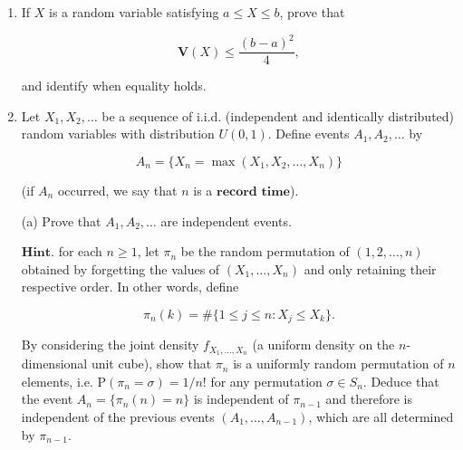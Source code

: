 \documentclass[11pt]{report}
\newcommand{\R}{\mathbb{R}}
\theoremstyle{plain}
\theoremstyle{definition}
\begin{document}
\begin{enumerate}[label=\arabic*.]
\noindent Deduce using the mean value theorem that if $\varphi$
is twice continuously differentiable and satisfies
$\varphi''\ge 0$ then it is convex.

(b) Prove $\textbf{Jensen's inequality}$, which says
that if $X$ is a random variable such that
$\mathrm{P}(X\in (a,b))=1$ and $\varphi:(a,b)\to\R$
is convex, then

\[
\varphi(\mathbf{E}X) \le \mathbf{E}(\varphi(X)).
\]

\noindent $\textbf{Hint.}$ Start by proving the following
property of a convex function: If $\varphi$ is convex
then at any point $x_0\in (a,b)$, $\varphi$ has a
$\textbf{supporting line}$, that is, a linear
function $y(x)=ax+b$ such that $y(x_0)=\varphi(x_0)$
and such that $\varphi(x)\ge y(x)$ for all $x\in(a,b)$
(to prove its existence, use the characterization of
convexity from part (a) to show that the left-sided
derivative of $\varphi$ at $x_0$ is less than or
equal to the right-sided derivative at $x_0$; the
supporting line is a line passing through the point
$(x_0,\varphi(x_0))$ whose slope lies between these
two numbers). Now take the supporting line function at
$x_0=\mathbf{E}X$ and see what happens.

\item If $X$ is a random variable satisfying $a\le X\le b$,
prove that

\[
\mathbf{V}(X) \le \frac{(b-a)^2}{4},
\]

\noindent and identify when equality holds.

\item Let $X_1, X_2, \ldots$ be a sequence of i.i.d.
(independent and identically distributed) random
variables with distribution $U(0,1)$. Define events
$A_1, A_2, \ldots$ by

\[
A_n = \{ X_n = \max(X_1,X_2,\ldots,X_n) \}
\]

\noindent (if $A_n$ occurred, we say that $n$ is a
$\textbf{record time}$).

(a) Prove that $A_1,A_2,\ldots$ are independent
events.

$\textbf{Hint.}$ for each $n\ge 1$, let $\pi_n$ be
the random permutation of $(1,2,\ldots,n)$ obtained
by forgetting the values of $(X_1,\ldots,X_n)$ and
only retaining their respective order. In other words,
define

\[
\pi_n(k) = \#\{1\le j\le n : X_j \le X_k\}.
\]

\noindent By considering the joint density $f_{X_1,\ldots,X_n}$
(a uniform density on the $n$-dimensional unit cube),
show that $\pi_n$ is a uniformly random permutation
of $n$ elements, i.e.
$\mathrm{P}(\pi_n = \sigma) = 1/n!$ for any
permutation $\sigma \in S_n$. Deduce that the event
$A_n = \{\pi_n(n)=n\}$ is independent of $\pi_{n-1}$
and therefore is independent of the previous events
$(A_1,\ldots,A_{n-1})$, which are all determined by
$\pi_{n-1}$.


\end{enumerate}
\end{document}
